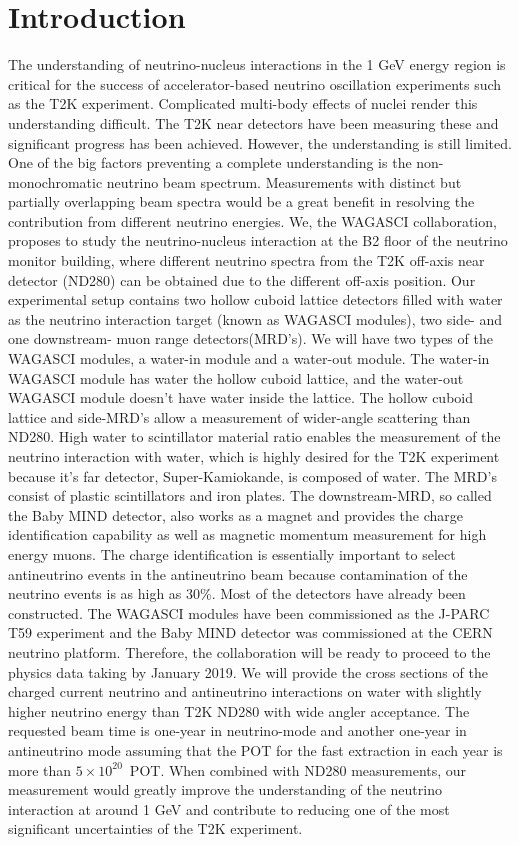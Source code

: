 \section{Introduction}

The understanding of neutrino-nucleus interactions in the 1 GeV energy region is critical for the success
of accelerator-based neutrino oscillation experiments such as the T2K experiment.
Complicated multi-body effects of nuclei render this understanding difficult.
The T2K near detectors have been measuring these and significant progress has been achieved.
However, the understanding is still limited.
One of the big factors preventing a complete understanding is the non-monochromatic neutrino beam spectrum.
Measurements with distinct but partially overlapping beam spectra would be a great benefit
in resolving the contribution from different neutrino energies.
We, the WAGASCI collaboration, proposes to study the neutrino-nucleus interaction
at the B2 floor of the neutrino monitor building, where different neutrino spectra from the T2K off-axis near detector (ND280) can be obtained due to the different off-axis position.
Our experimental setup contains two hollow cuboid lattice detectors filled with water as the neutrino interaction target (known as WAGASCI modules), two side- and one downstream- muon range detectors(MRD's).
We will have two types of the WAGASCI modules, a water-in module and a water-out module.
The water-in WAGASCI module has water the hollow cuboid lattice, and the water-out WAGASCI module doesn't have water inside the lattice.
The hollow cuboid lattice and side-MRD's allow a measurement of  wider-angle scattering than ND280.
High water to scintillator material ratio enables the measurement of the neutrino interaction with water, which is highly desired for the T2K experiment because it's far detector, Super-Kamiokande, is composed of water.
The MRD's consist of plastic scintillators and iron plates.
The downstream-MRD, so called the Baby MIND detector, also works as a magnet and provides the charge identification capability as well as magnetic momentum measurement for high energy muons.
The charge identification is essentially important to select antineutrino events in the antineutrino beam
because contamination of the neutrino events is as high as 30\%.
Most of the detectors have already been constructed.
The WAGASCI modules have been commissioned as the J-PARC T59 experiment and the Baby MIND detector was commissioned at the CERN neutrino platform.
Therefore, the collaboration will be ready to proceed to the physics data taking by January 2019.
We will provide the cross sections of the charged current neutrino and antineutrino interactions on water
with slightly higher neutrino energy than T2K ND280 with wide angler acceptance.
The requested beam time is one-year in neutrino-mode and another one-year in antineutrino mode
assuming that the POT for the fast extraction in each year is more than $5\times10^{20}$~POT.
When combined with ND280 measurements, our measurement would greatly improve the understanding of the neutrino interaction
at around 1 GeV 
and contribute to reducing one of the most significant uncertainties of the T2K experiment.

